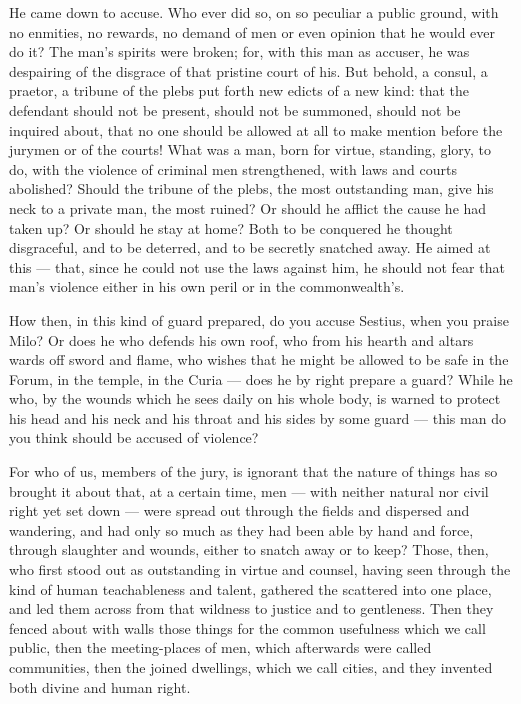  He came down to accuse. Who ever did so, on so peculiar a public ground, with no enmities, no rewards, no demand of men or even opinion that he would ever do it? The man's spirits were broken; for, with this man as accuser, he was despairing of the disgrace of that pristine court of his. But behold, a consul, a praetor, a tribune of the plebs put forth new edicts of a new kind: that the defendant should not be present, should not be summoned, should not be inquired about, that no one should be allowed at all to make mention before the jurymen or of the courts! What was a man, born for virtue, standing, glory, to do, with the violence of criminal men strengthened, with laws and courts abolished? Should the tribune of the plebs, the most outstanding man, give his neck to a private man, the most ruined? Or should he afflict the cause he had taken up? Or should he stay at home? Both to be conquered he thought disgraceful, and to be deterred, and to be secretly snatched away. He aimed at this --- that, since he could not use the laws against him, he should not fear that man's violence either in his own peril or in the commonwealth's.

 How then, in this kind of guard prepared, do you accuse Sestius, when you praise Milo? Or does he who defends his own roof, who from his hearth and altars wards off sword and flame, who wishes that he might be allowed to be safe in the Forum, in the temple, in the Curia --- does he by right prepare a guard? While he who, by the wounds which he sees daily on his whole body, is warned to protect his head and his neck and his throat and his sides by some guard --- this man do you think should be accused of violence?

 For who of us, members of the jury, is ignorant that the nature of things has so brought it about that, at a certain time, men --- with neither natural nor civil right yet set down --- were spread out through the fields and dispersed and wandering, and had only so much as they had been able by hand and force, through slaughter and wounds, either to snatch away or to keep? Those, then, who first stood out as outstanding in virtue and counsel, having seen through the kind of human teachableness and talent, gathered the scattered into one place, and led them across from that wildness to justice and to gentleness. Then they fenced about with walls those things for the common usefulness which we call public, then the meeting-places of men, which afterwards were called communities, then the joined dwellings, which we call cities, and they invented both divine and human right.

